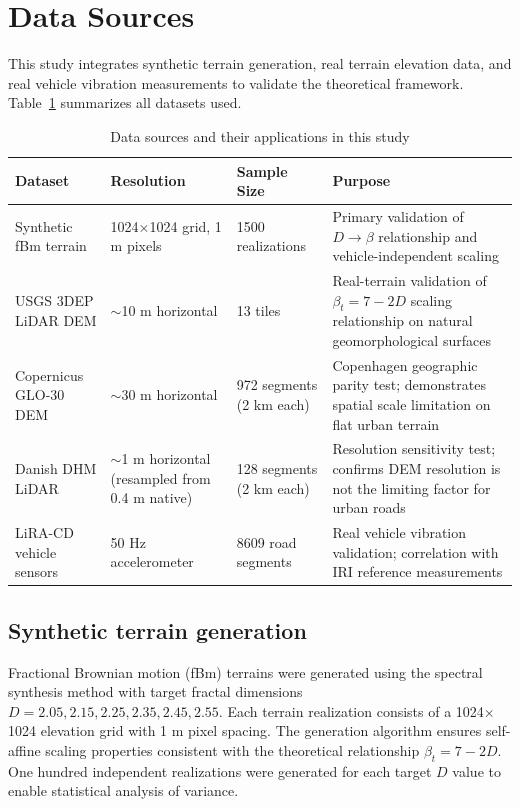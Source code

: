 \documentclass[11pt]{article}
\begin{document}
\section*{Data Sources}

This study integrates synthetic terrain generation, real terrain elevation data, and real vehicle vibration measurements to validate the theoretical framework. Table~\ref{tab:datasources} summarizes all datasets used.

\begin{table}[h]
\centering
\caption{Data sources and their applications in this study}
\label{tab:datasources}
\small
\begin{tabular}{p{3cm}p{2.5cm}p{2cm}p{6cm}}
\hline
\textbf{Dataset} & \textbf{Resolution} & \textbf{Sample Size} & \textbf{Purpose} \\
\hline
Synthetic fBm terrain & 1024$\times$1024 grid, 1 m pixels & 1500 realizations & Primary validation of $D \rightarrow \beta$ relationship and vehicle-independent scaling \\
\hline
USGS 3DEP LiDAR DEM & $\sim$10 m horizontal & 13 tiles & Real-terrain validation of $\beta_t = 7-2D$ scaling relationship on natural geomorphological surfaces \\
\hline
Copernicus GLO-30 DEM & $\sim$30 m horizontal & 972 segments (2 km each) & Copenhagen geographic parity test; demonstrates spatial scale limitation on flat urban terrain \\
\hline
Danish DHM LiDAR & $\sim$1 m horizontal (resampled from 0.4 m native) & 128 segments (2 km each) & Resolution sensitivity test; confirms DEM resolution is not the limiting factor for urban roads \\
\hline
LiRA-CD vehicle sensors & 50 Hz accelerometer & 8609 road segments & Real vehicle vibration validation; correlation with IRI reference measurements \\
\hline
\end{tabular}
\end{table}

\subsection*{Synthetic terrain generation}

Fractional Brownian motion (fBm) terrains were generated using the spectral synthesis method\cite{Musgrave2000} with target fractal dimensions $D = 2.05, 2.15, 2.25, 2.35, 2.45, 2.55$. Each terrain realization consists of a 1024$\times$1024 elevation grid with 1 m pixel spacing. The generation algorithm ensures self-affine scaling properties consistent with the theoretical relationship $\beta_t = 7-2D$. One hundred independent realizations were generated for each target $D$ value to enable statistical analysis of variance.
\end{document}
